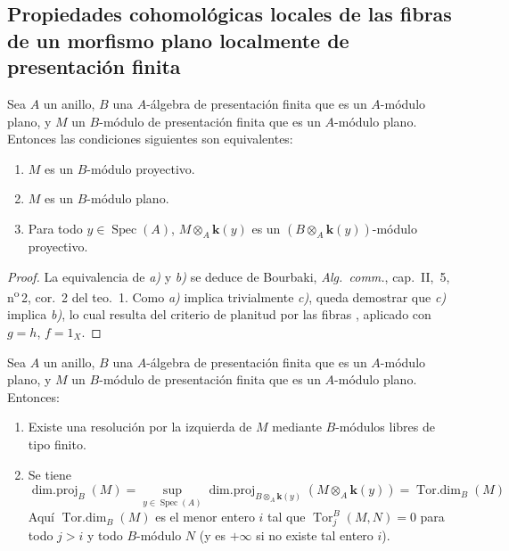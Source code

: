 \subsection{Propiedades cohomológicas locales de las fibras de un morfismo plano localmente de presentación finita}
\label{subsection:IV.12.3}

\begin{lemma}[12.3.1]
\label{IV.12.3.1}
Sea $A$ un anillo, $B$ una $A$-álgebra de presentación finita que es un $A$-módulo plano, y $M$ un $B$-módulo de presentación finita que es un $A$-módulo plano.
Entonces las condiciones siguientes son equivalentes:
\begin{enumerate}[label=\emph{\alph*)}]
  \item $M$ es un $B$-módulo proyectivo.
  \item $M$ es un $B$-módulo plano.
  \item Para todo $y\in\operatorname{Spec}(A)$, $M\otimes_A\boldsymbol{k}(y)$ es un $(B\otimes_A\boldsymbol{k}(y))$-módulo proyectivo.
\end{enumerate}
\end{lemma}

\begin{proof}

La equivalencia de \emph{a)} y \emph{b)} se deduce de Bourbaki, \emph{Alg.\ comm.}, cap.~II, \textsection\,5, n\textsuperscript{o}\,2, cor.~2 del teo.~1.
Como \emph{a)} implica trivialmente \emph{c)}, queda demostrar que \emph{c)} implica \emph{b)}, lo cual resulta del criterio de planitud por las fibras , aplicado con $g=h$, $f=1_X$.
\end{proof}

\begin{proposition}[12.3.2]
\label{IV.12.3.2}
Sea $A$ un anillo, $B$ una $A$-álgebra de presentación finita que es un $A$-módulo plano, y $M$ un $B$-módulo de presentación finita que es un $A$-módulo plano.
Entonces:
\begin{enumerate}[label=\textup{(\roman*)}]
  \item Existe una resolución por la izquierda de $M$ mediante $B$-módulos libres de tipo finito.
  \item Se tiene
  \begin{equation}
    \tag{12.3.2.1}
    \label{IV.12.3.2.1-fr}
    \operatorname{dim.proj}_B(M)
    =\sup_{y\in\operatorname{Spec}(A)}
    \operatorname{dim.proj}_{B\otimes_A\mathbf{k}(y)}(M\otimes_A\boldsymbol{k}(y))
    =\operatorname{Tor.dim}_B(M)
  \end{equation}
  Aquí $\operatorname{Tor.dim}_B(M)$ es el menor entero $i$ tal que $\operatorname{Tor}^B_j(M,N)=0$ para todo $j>i$ y todo $B$-módulo $N$ (y es $+\infty$ si no existe tal entero $i$).
\end{enumerate}
\end{proposition}

